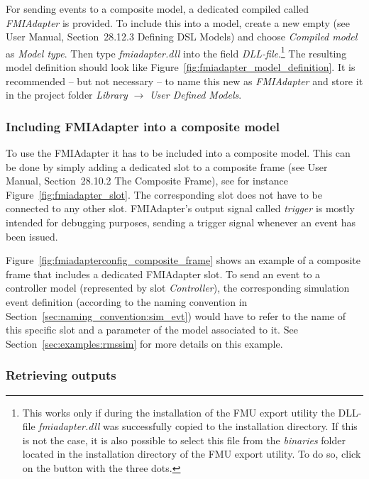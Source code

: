 For sending events to a composite model, a dedicated compiled \dslmodel called \emph{FMIAdapter} is provided.
To include this \dslmodel into a \pf model, create a new empty \dslmodel (see \pf User Manual, Section~28.12.3 Defining DSL Models) and choose \emph{Compiled model}  as \emph{Model type}.
Then type \emph{fmiadapter.dll} into the field \emph{DLL-file}.\footnote{
  This works only if during the installation of the FMU export utility the DLL-file \emph{fmiadapter.dll} was successfully copied to the \pf installation directory.
  If this is not the case, it is also possible to select this file from the \emph{binaries} folder located in the installation directory of the FMU export utility. To do so, click on the button with the three dots.}
The resulting model definition should look like Figure~\ref{fig:fmiadapter_model_definition}.
It is recommended -- but not necessary -- to name this new \dslmodel as \emph{FMIAdapter} and store it in the project folder \emph{Library} $\to$ \emph{User Defined Models}.

\subsubsection*{Including \dslmodel FMIAdapter into a composite model}

To use the \dslmodel FMIAdapter it has to be included into a composite model.
This can be done by simply adding a dedicated slot to a composite frame (see \pf User Manual, Section~28.10.2 The Composite Frame), see for instance Figure~\ref{fig:fmiadapter_slot}.
The corresponding slot does not have to be connected to any other slot.
FMIAdapter's output signal called \emph{trigger} is mostly intended for debugging purposes, sending a trigger signal whenever an event has been issued.

Figure~\ref{fig:fmiadapterconfig_composite_frame} shows an example of a composite frame that includes a dedicated FMIAdapter slot.
To send an event to a controller model (represented by slot \emph{Controller}), the corresponding simulation event definition (according to the naming convention in Section~\ref{sec:naming_convention:sim_evt}) would have to refer to the name of this specific slot and a parameter of the model associated to it.
See Section~\ref{sec:examples:rmssim} for more details on this example.

\subsubsection*{Retrieving outputs}

